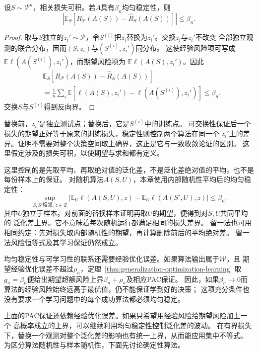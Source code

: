 \begin{theorem}[均匀稳定性与期望风险]
\label{thm:stability-expected-generalization}
设$S\sim\mathcal P^n$，相关损失可积。若$A$具有$\beta_n$均匀稳定性，则
\begin{equation}
 \left|\mathbb E_S\left[R_{\mathcal P}(A(S))-\hat R_S(A(S))\right]\right|
 \leq\beta_n.
 \label{eq:stability-expectation-bound}
\end{equation}
\end{theorem}

\begin{proof}
取与$S$独立的$z_i'\sim\mathcal P$，令$S^{(i)}$把$z_i$替换为$z_i'$。交换$z_i$与$z_i'$不改变
全部独立观测的联合分布，因而$(S,z_i)$与$(S^{(i)},z_i')$同分布。
这使经验风险项可写成$\mathbb E\ell(A(S^{(i)}),z_i')$，而期望风险项为
$\mathbb E\ell(A(S),z_i')$。因此
\begin{align*}
 &\mathbb E_S[R_{\mathcal P}(A(S))-\hat R_S(A(S))]\\
 &=\frac1n\sum_i\mathbb E
   [\ell(A(S),z_i')-\ell(A(S^{(i)}),z_i')]
 \leq\beta_n.
\end{align*}
交换$S$与$S^{(i)}$得到反向界。

\end{proof}

替换前，$z_i'$是独立测试点；替换后，它是$S^{(i)}$中的训练点。
可交换性保证后一个损失的期望正好等于原来的训练损失，稳定性则控制两个算法在同一个
$z_i'$上的差异。证明不需要对整个决策空间取上确界，这正是它与一致收敛论证的区别。
这里假定涉及的损失可积，以使期望与求和都有定义。

这里控制的是先取平均、再取绝对值的泛化差，不是泛化差绝对值的平均，也不是每份样本上的保证。
对随机算法$A(S,U)$，本章使用内部随机性平均后的均匀稳定性：
\[
 \sup_{S,S'\text{相邻},\,z\in Z}
 \left|\mathbb E_U\ell(A(S,U),z)-\mathbb E_U\ell(A(S',U),z)\right|\leq\beta_n.
\]
其中$U$独立于样本。对前面的替换样本证明再取$U$的期望，便得到对$S,U$共同平均的
泛化差上界。它不意味着每次随机运行都满足相同的损失差界。
留一法也可用相同约定：先对损失取内部随机性的期望，再计算删除前后的平均绝对差。
留一法风险恒等式及其学习保证仍然成立。

均匀稳定性与可学习性的联系还需要经验优化误差。如果算法输出属于$\mathcal W$，且
期望经验优化误差不超过$\rho_n$，定理~\ref{thm:generalization-optimization-learning}
取$g_n=\beta_n$便给出期望超额风险上界$\beta_n+\rho_n$及相应PAC保证。
因此，如果$\beta_n\to0$而算法的经验风险始终远高于最优值，仍不能保证学到好的决策；
这项充分条件也没有要求一个学习问题中的每个成功算法都必须均匀稳定。

上面的PAC保证还依赖经验优化误差。如果只希望用经验风险给期望风险加上一个
高概率成立的上界，可以继续利用均匀稳定性控制泛化差的波动。
在有界损失下，替换一个观测对整个泛化差的影响也有统一上界，从而能应用集中不等式。
为区分算法随机性与样本随机性，下面先讨论确定性算法。

